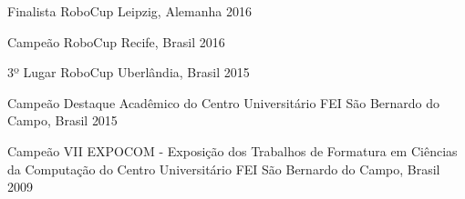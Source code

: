 



\begin{cvhonors}

  \cvhonor
    {Finalista} %
    {RoboCup \@Home} %
    {Leipzig, Alemanha} %
    {2016} %

\end{cvhonors}




\begin{cvhonors}

  \cvhonor
    {Campeão} %
    {RoboCup \@Home} %
    {Recife, Brasil} %
    {2016} %

  \cvhonor
    {3º Lugar} %
    {RoboCup \@Home} %
    {Uberlândia, Brasil} %
    {2015} %

  \cvhonor
    {Campeão} %
    {Destaque Acadêmico do Centro Universitário FEI} %
    {São Bernardo do Campo, Brasil} %
    {2015} %

  \cvhonor
    {Campeão} %
    {VII EXPOCOM - Exposição dos Trabalhos de Formatura em Ciências da Computação do Centro Universitário FEI} %
    {São Bernardo do Campo, Brasil} %
    {2009} %

\end{cvhonors}
